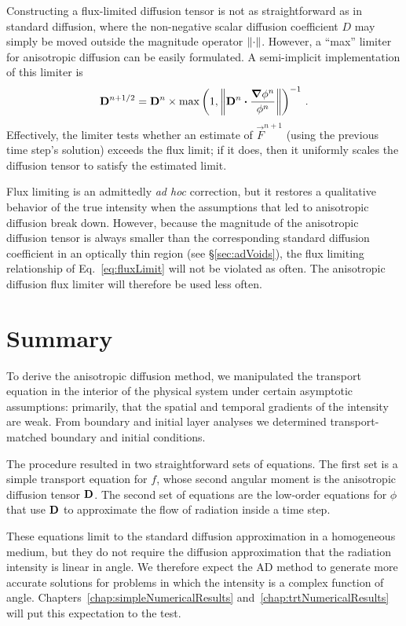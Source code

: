 Constructing a flux-limited diffusion tensor is not as straightforward as in
standard diffusion, where the non-negative scalar diffusion coefficient $D$ may
simply be moved outside the magnitude operator $\left\| \cdot \right\|$.
However, a ``max'' limiter for anisotropic diffusion can be easily formulated.
A semi-implicit implementation of this limiter is
\begin{equation}\label{eq:flad}
  \mathbf{D}^{n+1/2} = \mathbf{D}^{n} \times 
  \max\left( 1, \left\| \mathbf{D}^{n}\bm{\cdot} \frac{\bm{\nabla} \phi^{n}}{\phi^{n}} \right\|
  \right)^{-1} \,.
\end{equation}
Effectively, the limiter tests whether an estimate of $\vec{F}^{n+1}$ (using the
previous time step's solution) exceeds the flux limit; if it does, then it
uniformly scales the diffusion tensor to satisfy the estimated limit.

Flux limiting is an admittedly \emph{ad hoc} correction, but it restores a
qualitative behavior of the true intensity when the assumptions that led to
anisotropic diffusion break down. However, because the magnitude of the
anisotropic diffusion tensor is always smaller than the corresponding standard
diffusion coefficient in an optically thin region (see \S\ref{sec:adVoids}), the
flux limiting relationship of Eq.~\eqref{eq:fluxLimit} will not be violated as
often. The anisotropic diffusion flux limiter will therefore be used less often.

\section{Summary}
To derive the anisotropic diffusion method, we manipulated the transport
equation in the interior of the physical system under certain asymptotic
assumptions: primarily, that
the spatial and temporal gradients of the intensity are weak. From boundary and
initial layer analyses we determined transport-matched boundary and initial
conditions.  

The procedure resulted in two straightforward sets of equations. The first set
is a simple transport equation for $f$, whose second angular moment is
the anisotropic diffusion tensor $\mathbf{D}$. The second set of equations are the
low-order equations for $\phi$ that use $\mathbf{D}$ to approximate the flow of
radiation inside a time step. 

These equations limit to the standard diffusion approximation in a homogeneous
medium, but they do not require the diffusion approximation that the radiation
intensity is linear in
angle. We therefore expect the AD method to generate more accurate solutions
for problems in which the intensity is a complex function of angle.
Chapters~\ref{chap:simpleNumericalResults}
and~\ref{chap:trtNumericalResults} will put this expectation to the test.

